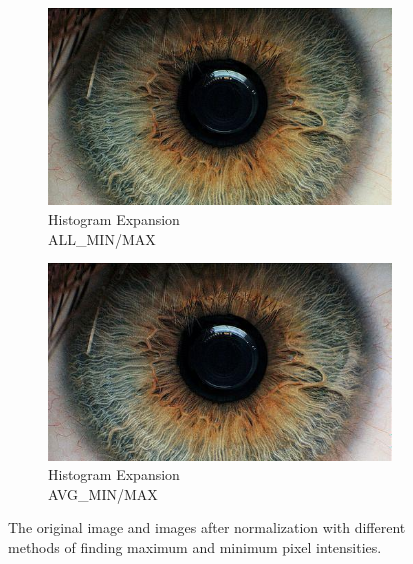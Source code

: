 \documentclass{article}
\begin{document}
\begin{figure}[H]
\begin{subfigure}[b]{0.5\linewidth}
\centering
  \includegraphics[width=0.9\linewidth]{res/hist_all.jpg}
  \caption{Histogram Expansion \\ ALL\_MIN/MAX}
   \label{fig:hist_clr_all}
\end{subfigure}%
\begin{subfigure}[b]{0.5\linewidth}
\centering
  \includegraphics[width=0.9\linewidth]{res/hist_avg.jpg}
  \caption{Histogram Expansion \\ AVG\_MIN/MAX}
   \label{fig:hist_clr_avg}
\end{subfigure}%




  \caption{The original image and images after normalization with different methods of finding maximum and minimum pixel intensities.}
  
\vspace{-12pt}
  \label{fig:histogram_clr}
\end{figure}
\end{document}
